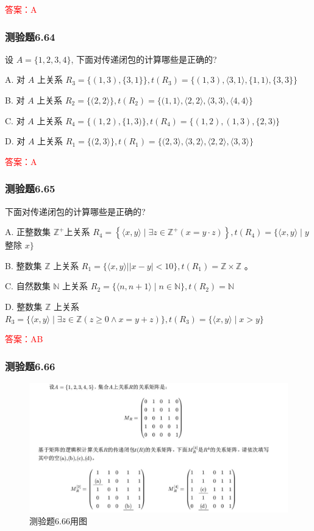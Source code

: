 \documentclass[UTF8, heading=true]{ctexart}
\begin{document}
\textcolor{red}{答案：A}

\subsubsection{测验题6.64}

设 $A=\{1,2,3,4\}$, 下面对传递闭包的计算哪些是正确的?

A. 
对 $A$ 上关系 $R_3=\{(1,3),\{3,1\}\}, t\left(R_3\right)=\{(1,3),\langle 3,1\rangle,\{1,1),\{3,3\}\}$

B. 
对 $A$ 上关系 $R_2=\{(2,2\rangle\}, t\left(R_2\right)=\{(1,1\rangle,\langle 2,2\rangle,\langle 3,3\rangle,\langle 4,4\rangle\}$

C. 
对 $A$ 上关系 $R_4=\{(1,2),\{1,3)\}, t\left(R_4\right)=\{(1,2),(1,3),\{2,3)\}$

D. 
对 $A$ 上关系 $R_1=\{(2,3\rangle\}, t\left(R_1\right)=\{(2,3\rangle,\langle 3,2\rangle,\langle 2,2\rangle,\langle 3,3\rangle\}$

\textcolor{red}{答案：A}


\subsubsection{测验题6.65}
下面对传递闭包的计算哪些是正确的?

A. 正整数集 $\mathbb{Z}^{+}$上关系 $R_4=\left\{\langle x, y\rangle \mid \exists z \in \mathbb{Z}^{+}(x=y \cdot z)\right\}, t\left(R_4\right)=\{\langle x, y\rangle \mid y$ 整除 $x\}$

B. 整数集 $\mathbb{Z}$ 上关系 $R_1=\{\langle x, y\rangle| | x-y \mid<10\}, t\left(R_1\right)=\mathbb{Z} \times \mathbb{Z}$ 。

C. 自然数集 $\mathbb{N}$ 上关系 $R_2=\{\langle n, n+1\rangle \mid n \in \mathbb{N}\}, t\left(R_2\right)=\mathbb{N}$

D. 整数集 $\mathbb{Z}$ 上关系 $R_3=\{\langle x, y\rangle \mid \exists z \in \mathbb{Z}(z \geq 0 \wedge x=y+z)\}, t\left(R_3\right)=\{\langle x, y\rangle \mid x>y\}$

\textcolor{red}{答案：AB}

\subsubsection{测验题6.66}
\begin{figure}[htbp]
    \centering
    \includegraphics[width=1\textwidth]{6.66.jpg} %
    \caption{测验题6.66用图}
\end{figure}
\end{document}

